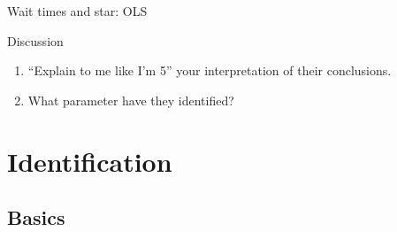 \documentclass{beamer}
\begin{document}
\begin{frame}{Wait times and star: OLS}
	
	\begin{figure}
	\end{figure}
	
\end{frame}

\begin{frame}{Discussion}


\begin{enumerate}
\item  ``Explain to me like I'm 5'' your interpretation of their conclusions.
\item What parameter have they identified?
\end{enumerate}

\end{frame}






\section{Identification}

\subsection{Basics}
\end{document}
